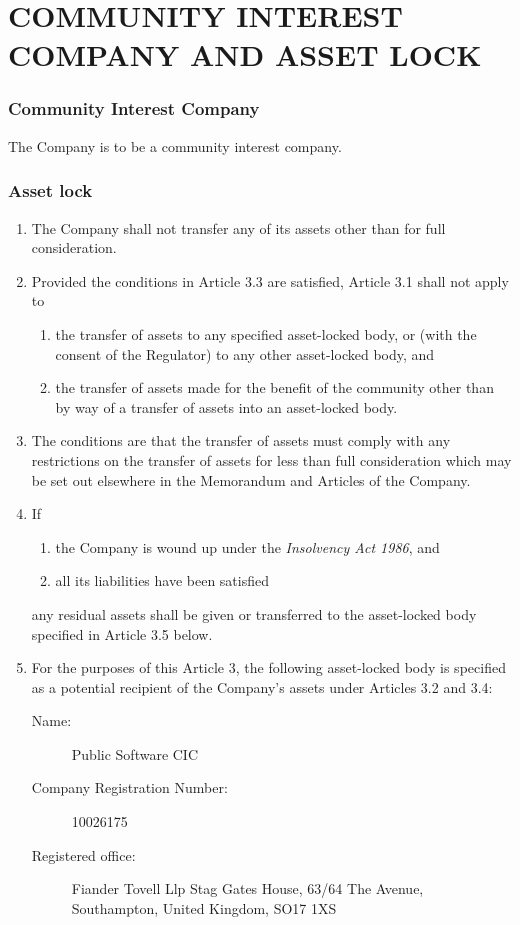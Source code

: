 \documentclass[a4paper,12pt]{article}
\renewcommand{\labelenumii}{(\alph{enumii})}
\begin{document}
\part*{COMMUNITY INTEREST COMPANY AND ASSET LOCK}

\section{Community Interest Company}

The Company is to be a community interest company. %

\section{Asset lock}

\begin{enumerate}
  \item The Company shall not transfer any of its assets other than for full consideration. %
  \item Provided the conditions in Article 3.3 are satisfied, Article 3.1 shall not apply to %
  \begin{enumerate}
    \renewcommand{\labelenumii}{(\alph{enumii})}
    \item the transfer of assets to any specified asset-locked body, or (with the consent of the Regulator) to any other asset-locked body, and %
    \item the transfer of assets made for the benefit of the community other than by way of a transfer of assets into an asset-locked body. %
  \end{enumerate}
  \item The conditions are that the transfer of assets must comply with any restrictions on the transfer of assets for less than full consideration which may be set out elsewhere in the Memorandum and Articles of the Company. %
  \item If
  \begin{enumerate}
    \item the Company is wound up under the \textit{Insolvency Act 1986}, and
    \item all its liabilities have been satisfied
  \end{enumerate}
  any residual assets shall be given or transferred to the asset-locked body specified in Article 3.5 below.
  \item For the purposes of this Article 3, the following asset-locked body is specified as a potential recipient of the Company’s assets under Articles 3.2 and 3.4:
  \begin{description}
    \item[Name:] Public Software CIC
    \item[Company Registration Number:] 10026175
    \item[Registered office:] Fiander Tovell Llp Stag Gates House, 63/64 The Avenue, Southampton, United Kingdom, SO17 1XS
  \end{description}
\end{enumerate}
\end{document}
